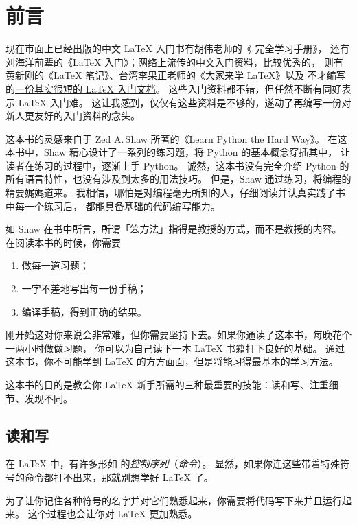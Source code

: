 \chapter{前言}
\label{chap:preface}
现在市面上已经出版的中文 \LaTeX{} 入门书有胡伟老师的《\LaTeXe{} 完全学习手册》，
还有刘海洋前辈的《\LaTeX{} 入门》；网络上流传的中文入门资料，比较优秀的，
则有黄新刚的《\LaTeX{} 笔记》、台湾李果正老师的《大家来学 \LaTeX{}》以及
不才编写的\href{http://liam0205.me/2014/09/08/latex-introduction/}%
  {\uline{一份其实很短的 \LaTeX{} 入门文档}}。
这些入门资料都不错，但任然不断有同好表示 \LaTeX{} 入门难。
这让我感到，仅仅有这些资料是不够的，遂动了再编写一份对新人更友好的入门资料的念头。

这本书的灵感来自于 Zed A.\,Shaw 所著的《Learn Python the Hard Way》。
在这本书中，Shaw 精心设计了一系列的练习题，将 Python 的基本概念穿插其中，
让读者在练习的过程中，逐渐上手 Python。
诚然，这本书没有完全介绍 Python 的所有语言特性，也没有涉及到太多的用法技巧。
但是，Shaw 通过练习，将编程的精要娓娓道来。
我相信，哪怕是对编程毫无所知的人，仔细阅读并认真实践了书中每一个练习后，
都能具备基础的代码编写能力。

如 Shaw 在书中所言，所谓「笨方法」指得是教授的方式，而不是教授的内容。
在阅读本书的时候，你需要
\begin{enumerate}
  \item 做每一道习题；
  \item 一字不差地写出每一份手稿；
  \item 编译手稿，得到正确的结果。
\end{enumerate}
刚开始这对你来说会非常难，但你需要坚持下去。如果你通读了这本书，每晚花个一两小时做做习题，
你可以为自己读下一本 \LaTeX{} 书籍打下良好的基础。
通过这本书，你不可能学到 \LaTeX{} 的方方面面，但是将能习得最基本的学习方法。

这本书的目的是教会你 \LaTeX{} 新手所需的三种最重要的技能：读和写、注重细节、发现不同。

\section*{读和写}
\label{sec:read_and_write}

在 \LaTeX{} 中，有许多形如 
的\emph{控制序列}（\emph{命令}）。
显然，如果你连这些带着特殊符号的命令都打不出来，那就别想学好 \LaTeX{} 了。

为了让你记住各种符号的名字并对它们熟悉起来，你需要将代码写下来并且运行起来。
这个过程也会让你对 \LaTeX{} 更加熟悉。


